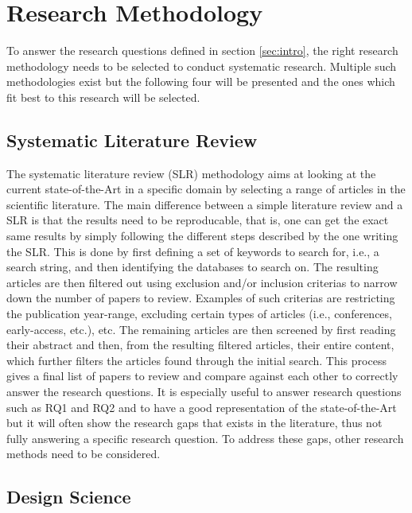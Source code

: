 
\section{Research Methodology}
\label{sec:methodology}

To answer the research questions defined in section \ref{sec:intro},
the right research methodology needs to be selected to conduct 
systematic research.
Multiple such methodologies exist but the following four will be presented
and the ones which fit best to this research will be selected.

\subsection{Systematic Literature Review}

The systematic literature review (SLR) methodology aims at
looking at the current state-of-the-Art in a specific domain by selecting a range 
of articles in the scientific literature\cite{KITCHENHAM2009SLR}.
The main difference between a simple literature review and 
a SLR is that the results need to be reproducable,
that is, one can get the exact same results by simply following the different steps described by the one writing the SLR.
This is done by first defining a set of keywords to search for, i.e., a search string, 
and then identifying the databases to search on.
The resulting articles are then filtered out using exclusion and/or inclusion criterias
to narrow down the number of papers to review.
Examples of such criterias are restricting the publication year-range,
excluding certain types of articles (i.e., conferences, early-access, etc.), etc.
The remaining articles are then screened by first reading 
their abstract and then, from the resulting filtered articles, their entire content,
which further filters the articles found through the initial search.
This process gives a final list of papers to review and compare against each other 
to correctly answer the research questions. 
It is especially useful to answer research questions such as RQ1 and RQ2
and to have a good representation of the state-of-the-Art
but it will often show the research gaps that exists in the literature,
thus not fully answering a specific research question.
To address these gaps, other research methods need to be considered.

\subsection{Design Science}

